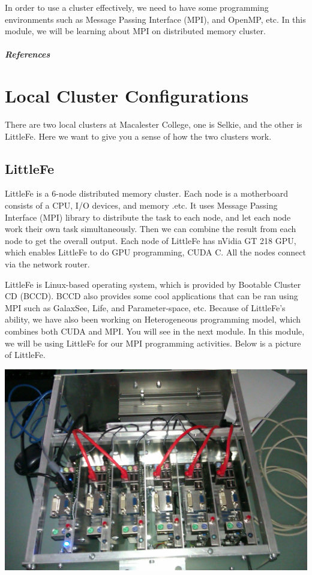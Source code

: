 \documentclass[letterpaper,10pt,openany,oneside]{sphinxmanual}
\begin{document}
In order to use a cluster effectively, we need to have some programming environments such as Message Passing Interface (MPI), and OpenMP, etc. In this module, we will be learning about MPI on distributed memory cluster.
\paragraph{References}


\chapter{Local Cluster Configurations}
\label{LocalClusterConfig/LocalClusterConfig:local-cluster-configurations}\label{LocalClusterConfig/LocalClusterConfig::doc}
There are two local clusters at Macalester College, one is Selkie, and the other is LittleFe. Here we want to give you a sense of how the two clusters work.


\section{LittleFe}
\label{LocalClusterConfig/LocalClusterConfig:littlefe}
LittleFe is a 6-node distributed memory cluster. Each node is a motherboard consists of a CPU, I/O devices, and memory .etc. It uses Message Passing Interface (MPI) library to distribute the task to each node, and let each node work their own task simultaneously. Then we can combine the result from each node to get the overall output. Each node of LittleFe has nVidia GT 218 GPU, which enables LittleFe to do GPU programming, CUDA C. All the nodes connect via the network router.

LittleFe is Linux-based operating system, which is provided by Bootable Cluster CD (BCCD). BCCD also provides some cool applications that can be ran using MPI such as GalaxSee, Life, and Parameter-space, etc. Because of LittleFe's ability, we have also been working on Heterogeneous programming model, which combines both CUDA and MPI. You will see in the next module. In this module, we will be using LittleFe for our MPI programming activities. Below is a picture of LittleFe.

{\hfill\includegraphics{LittleFe.jpg}\hfill}
\end{document}
